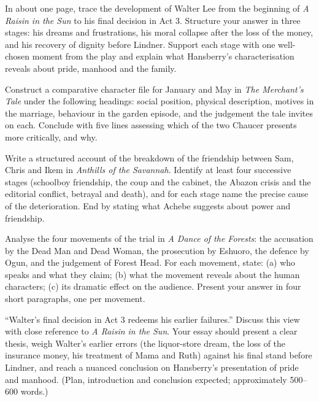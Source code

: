 \documentclass[11pt]{article}
\newcounter{popsec}
\newcounter{popsub}
\newcommand{\courssub}[1]{%
  \stepcounter{popsub}%
  \par\vspace{9pt}\noindent{\popxbold\fontsize{11.5}{13}\selectfont\color{popink}{\color{poporange}\thepopsec.\thepopsub}\hspace{6pt}#1}\par\nopagebreak\vspace{4pt}
}
\begin{document}
\courssub{I practise}

\begin{exercice}
In about one page, trace the development of Walter Lee from the beginning of \emph{A Raisin in the Sun} to his final decision in Act 3. Structure your answer in three stages: his dreams and frustrations, his moral collapse after the loss of the money, and his recovery of dignity before Lindner. Support each stage with one well-chosen moment from the play and explain what Hansberry's characterisation reveals about pride, manhood and the family.
\end{exercice}

\begin{exercice}
Construct a comparative character file for January and May in \emph{The Merchant's Tale} under the following headings: social position, physical description, motives in the marriage, behaviour in the garden episode, and the judgement the tale invites on each. Conclude with five lines assessing which of the two Chaucer presents more critically, and why.
\end{exercice}

\begin{exercice}
Write a structured account of the breakdown of the friendship between Sam, Chris and Ikem in \emph{Anthills of the Savannah}. Identify at least four successive stages (schoolboy friendship, the coup and the cabinet, the Abazon crisis and the editorial conflict, betrayal and death), and for each stage name the precise cause of the deterioration. End by stating what Achebe suggests about power and friendship.
\end{exercice}

\begin{exercice}
Analyse the four movements of the trial in \emph{A Dance of the Forests}: the accusation by the Dead Man and Dead Woman, the prosecution by Eshuoro, the defence by Ogun, and the judgement of Forest Head. For each movement, state: (a) who speaks and what they claim; (b) what the movement reveals about the human characters; (c) its dramatic effect on the audience. Present your answer in four short paragraphs, one per movement.
\end{exercice}

\courssub{I prepare for the GCE}

\begin{exercice}
``Walter's final decision in Act 3 redeems his earlier failures.'' Discuss this view with close reference to \emph{A Raisin in the Sun}. Your essay should present a clear thesis, weigh Walter's earlier errors (the liquor-store dream, the loss of the insurance money, his treatment of Mama and Ruth) against his final stand before Lindner, and reach a nuanced conclusion on Hansberry's presentation of pride and manhood. (Plan, introduction and conclusion expected; approximately 500--600 words.)
\end{exercice}
\end{document}
